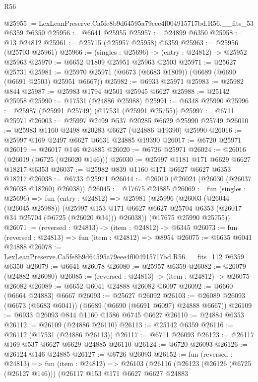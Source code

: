 \begin{lexlean}{R56}
\begin{coremodule}
@25955 := LexLeanPreserve.Ca5fe8b9d64595a79eee4f004915717bd.R56.__fits_53 @6359 @6350
@25956 := @6641 @25955
@25957 := @24899 @6350
@25958 := @13 @24812
@25961 := @25715 (@25957 @25958) @6359
@25963 := @25956 (@25703 @25961)
@25966 := (singles : @25696) -> (entry : @24812) -> @25952 @25963
@25970 := @6652 @1809 @25951 @25963 @2503
@25971 := @25627 @25731
@25981 := @25970 @25971 (@6673 (@6683 @1809)) (@6689 (@6690 (@6691 @2503) @25951 @6667))
@25982 := @6933 @25971
@25983 := @25982 @844
@25987 := @25983 @1794 @2501 @25945 @6627
@25988 := @25142 @25958
@25990 := @17531 (@24886 @25988)
@25991 := @6348 @25990
@25996 := @25987 (@25991 @25749) (@17531 (@25991 @25755))
@25997 := @6711 @25971
@26003 := @25997 @2499 @537 @20285 @6629 @25990 @25749
@26010 := @25983 @1160 @2498 @20283 @6627 (@24886 @19390) @25990
@26016 := @25997 @169 @2497 @6627 @6631 @24885 @19390
@26017 := @6720 @25971
@26019 := @26017 @146 @24885
@26020 := @6726 @25971
@26024 := @26016 (@26019 (@6725 (@26020 @146)))
@26030 := @25997 @1181 @171 @6629 @6627 @18217 @6353
@26037 := @25982 @839 @1160 @171 @6627 @6627 @6353 @18217
@26038 := @6733 @25971
@26044 := @26010 (@26024 (@26030 (@26037 @26038 @18260) @26038))
@26045 := @17675 @24885
@26069 := fun (singles : @25696) =>
  fun (entry : @24812) =>
  @25981
    (@25996
      (@26003
        (@26044 (@26045 @25988))
        (@25997 @153 @171 @6627 @6627 @25704 @6353 (@26017 @34 @25704 (@6725 (@26020 @34))) @26038))
      (@17675 @25990 @25755))
@26071 := (reversed : @24813) -> (item : @24812) -> @6345
@26073 := fun (reversed : @24813) => fun (item : @24812) => @8954
@26075 := @6635 @6041 @24888
@26078 := LexLeanPreserve.Ca5fe8b9d64595a79eee4f004915717bd.R56.__fits_112 @6359 @6350
@26079 := @6641 @26078
@26080 := @25957 @6359
@26082 := @26079 (@24882 @26080)
@26085 := (reversed : @24813) -> (item : @24812) -> @26075 @26082
@26089 := @6652 @6041 @24888 @26082 @6097
@26092 := @6660 (@6664 @24883) @6667
@26093 := @25627 @26092
@26103 := @26089 @26093 (@6673 (@6683 @6041)) (@6689 (@6690 (@6691 @6097) @24888 @6667))
@26109 := @6933 @26093 @844 @1160 @1586 @6745 @6627
@26110 := @24884 @6353
@26112 := @26109 (@24886 @26110)
@26113 := @25142 @6359
@26116 := @26112 (@17531 (@24886 @26113))
@26117 := @6711 @26093
@26123 := @26117 @169 @537 @6627 @6629 @24885 @26110
@26124 := @6720 @26093
@26126 := @26124 @146 @24885
@26127 := @6726 @26093
@26152 := fun (reversed : @24813) =>
  fun (item : @24812) =>
  @26103
    (@26116
      (@26123
        (@26126 (@6725 (@26127 @146)))
        (@26117
          @153
          @171
          @6627
          @6627
          @24883

\end{coremodule}
\end{lexlean}
